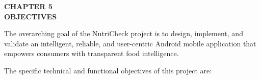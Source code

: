 \documentclass[12pt]{article}
\begin{document}
\newpage

\begin{center}
\textbf{\Large CHAPTER 5}\\[0.5cm]
\textbf{\Large OBJECTIVES}\\[1cm]
\end{center}

\noindent
The overarching goal of the NutriCheck project is to design, implement, and validate an intelligent, reliable, and user-centric Android mobile application that empowers consumers with transparent food intelligence.

\vspace{0.3cm}

\noindent
The specific technical and functional objectives of this project are:
\end{document}
